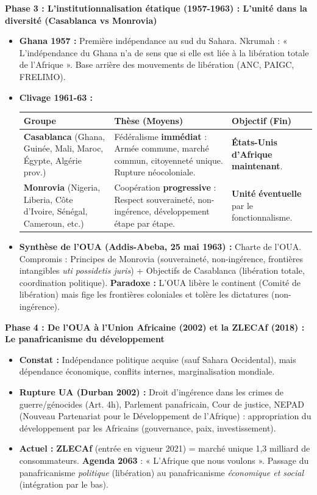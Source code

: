 \documentclass[11pt]{article}
\newcommand{\cle}[1]{{\popxbold\color{popdark}#1}}
\begin{document}
\begin{exoresolu}
\textbf{Phase 3 : L'institutionnalisation étatique (1957-1963) : L'unité dans la diversité (Casablanca vs Monrovia)}
\begin{itemize}
    \item \textbf{Ghana 1957 :} Première indépendance au sud du Sahara. Nkrumah : « L'indépendance du Ghana n'a de sens que si elle est liée à la libération totale de l'Afrique ». Base arrière des mouvements de libération (ANC, PAIGC, FRELIMO).
    \item \textbf{Clivage 1961-63 :}
    \begin{center}
    \begin{tabularx}{\linewidth}{|l|X|X|}\hline
    \rowcolor{popblueL} \textbf{Groupe} & \textbf{Thèse (Moyens)} & \textbf{Objectif (Fin)} \\ \hline
    \textbf{Casablanca} (Ghana, Guinée, Mali, Maroc, Égypte, Algérie prov.) & Fédéralisme \textbf{immédiat} : Armée commune, marché commun, citoyenneté unique. Rupture néocoloniale. & \textbf{États-Unis d'Afrique} \textbf{maintenant}. \\ \hline
    \textbf{Monrovia} (Nigeria, Liberia, Côte d'Ivoire, Sénégal, Cameroun, etc.) & Coopération \textbf{progressive} : Respect souveraineté, non-ingérence, développement étape par étape. & \textbf{Unité} \textbf{éventuelle} par le fonctionnalisme. \\ \hline
    \end{tabularx}
    \end{center}
    \item \textbf{Synthèse de l'OUA (Addis-Abeba, 25 mai 1963) :} Charte de l'OUA. Compromis : \cle{Principes de Monrovia} (souveraineté, non-ingérence, frontières intangibles \emph{uti possidetis juris}) + \cle{Objectifs de Casablanca} (libération totale, coordination politique). \textbf{Paradoxe :} L'OUA libère le continent (Comité de libération) mais fige les frontières coloniales et tolère les dictatures (non-ingérence).
\end{itemize}

\textbf{Phase 4 : De l'OUA à l'Union Africaine (2002) et la ZLECAf (2018) : Le panafricanisme du développement}
\begin{itemize}
    \item \textbf{Constat :} Indépendance politique acquise (sauf Sahara Occidental), mais dépendance économique, conflits internes, marginalisation mondiale.
    \item \textbf{Rupture UA (Durban 2002) :} Droit d'ingérence dans les crimes de guerre/génocides (Art. 4h), Parlement panafricain, Cour de justice, \cle{NEPAD} (Nouveau Partenariat pour le Développement de l'Afrique) : appropriation du développement par les Africains (gouvernance, paix, investissement).
    \item \textbf{Actuel :} \textbf{ZLECAf} (entrée en vigueur 2021) = marché unique 1,3 milliard de consommateurs. \textbf{Agenda 2063} : « L'Afrique que nous voulons ». Passage du panafricanisme \emph{politique} (libération) au panafricanisme \emph{économique et social} (intégration par le bas).
\end{itemize}


\end{exoresolu}
\end{document}
